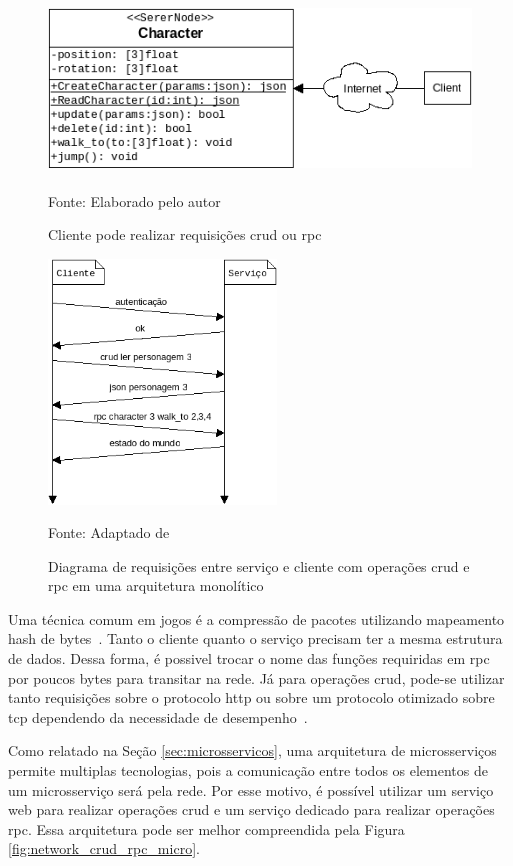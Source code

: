 \begin{figure}[htb!]
\caption{Cliente pode realizar requisições \ac{crud} ou \ac{rpc}}
\label{fig:crud_rpc}
\includegraphics[height=4.5cm]{img/cap2/crud_rpc.png}
\centering

Fonte: Elaborado pelo autor
\end{figure}



\begin{figure}[htb!]
\caption{Diagrama de requisições entre serviço e cliente com operações \ac{crud} e \ac{rpc} em uma arquitetura monolítico}
\label{fig:network_crud_rpc}
\includegraphics[height=6.5cm]{img/cap2/network_rpc_crud.png}
\centering

Fonte: Adaptado de~\cite{LeckyThompson2008Nov}
\end{figure}



Uma técnica comum em jogos é a compressão de pacotes utilizando mapeamento hash de bytes~\cite{LeckyThompson2008Nov}.
%
Tanto o cliente quanto o serviço precisam ter a mesma estrutura de dados.
%
Dessa forma, é possivel trocar o nome das funções requiridas em \ac{rpc} por poucos bytes para transitar na rede.
%
Já para operações \ac{crud}, pode-se utilizar tanto requisições sobre o protocolo \ac{http} ou sobre um protocolo otimizado sobre \ac{tcp} dependendo da necessidade de desempenho~\cite{LeckyThompson2008Nov}.

Como relatado na Seção \ref{sec:microsservicos}, uma arquitetura de microsserviços permite multiplas tecnologias, pois a comunicação entre todos os elementos de um microsserviço será pela rede.
%
Por esse motivo, é possível utilizar um serviço web para realizar operações \ac{crud} e um serviço dedicado para realizar operações \ac{rpc}.
%
Essa arquitetura pode ser melhor compreendida pela Figura \ref{fig:network_crud_rpc_micro}.



